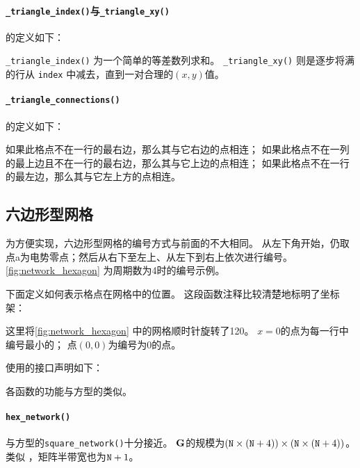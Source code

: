 \paragraph{\texttt{\_triangle\_index()}与\texttt{\_triangle\_xy()}}
的定义如下：{
    \linespread{1.0}
    
    
}\verb|_triangle_index()| 为一个简单的等差数列求和。
\verb|_triangle_xy()| 则是逐步将满的行从 \verb|index| 中减去，直到一对合理的$(x,y)$值。

\paragraph{\texttt{\_triangle\_connections()}}
的定义如下：
{
    \linespread{1.0}
    
}
如果此格点不在一行的最右边，那么其与它右边的点相连；
如果此格点不在一列的最上边且不在一行的最右边，那么其与它上边的点相连；
如果此格点不在一行的最左边，那么其与它左上方的点相连。

\subsection{六边形型网格}
为方便实现，六边形型网格的编号方式与前面的不大相同。
从左下角开始，仍取点a为电势零点；然后从右下至左上、从左下到右上依次进行编号。
\autoref{fig:network_hexagon} 为周期数为4时的编号示例。

下面定义如何表示格点在网格中的位置。
这段函数注释比较清楚地标明了坐标架：
{
    \linespread{1.0}
    
}
这里将\autoref{fig:network_hexagon} 中的网格顺时针旋转了120\textdegree 。
$x=0$的点为每一行中编号最小的；
点$(0,0)$为编号为0的点。

使用的接口声明如下：
{
    \linespread{1.0}
    
}
各函数的功能与方型的类似。

\paragraph{\texttt{hex\_network()}}
与方型的\verb|square_network()|十分接近。
$\vb{G}$的规模为$(\text{\texttt{N}}\times(\text{\texttt{N}}+4))\times(\text{\texttt{N}}\times(\text{\texttt{N}}+4))$。
类似 ，矩阵半带宽也为$\text{\texttt{N}}+1$。

